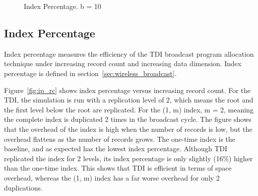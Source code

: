 \begin{figure}[!h]
  \centering
  \caption{\small Index Percentage. b = 10}
  \label{fig:ip}
\end{figure}


\subsection{Index Percentage}

Index percentage measures the efficiency of the TDI broadcast program
allocation technique under increasing record count and increasing data
dimension. Index percentage is defined in
section~\ref{sec:wireless_broadcast}.

Figure~\ref{fig:ip_rc} shows index percentage versus increasing
record count. For the TDI, the simulation is run with a
replication level of 2, which means the root and the first level
below the root are replicated. For the (1, m) index, m = 2,
meaning the complete index is duplicated 2 times in the broadcast
cycle. The figure shows that the overhead of the index is high
when the number of records is low, but the overhead flattens as
the number of records grows. The one-time index is the baseline,
and as expected has the lowest index percentage. Although TDI
replicated the index for 2 levels, its index percentage is only
slightly (16\%) higher than the one-time index. This shows that
TDI is efficient in terms of space overhead, whereas the (1, m)
index has a far worse overhead for only 2 duplications.

